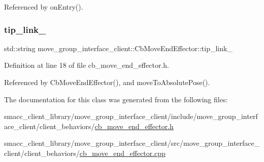 Referenced by on\+Entry().

\mbox{\label{classmove__group__interface__client_1_1CbMoveEndEffector_a26d35b0beeb0476a62a46b9b9d659251}} 
\subsubsection{\texorpdfstring{tip\+\_\+link\+\_\+}{tip\_link\_}}
{\footnotesize\ttfamily std\+::string move\+\_\+group\+\_\+interface\+\_\+client\+::\+Cb\+Move\+End\+Effector\+::tip\+\_\+link\+\_\+}



Definition at line 18 of file cb\+\_\+move\+\_\+end\+\_\+effector.\+h.



Referenced by Cb\+Move\+End\+Effector(), and move\+To\+Absolute\+Pose().



The documentation for this class was generated from the following files\+:\begin{DoxyCompactItemize}
\item 
smacc\+\_\+client\+\_\+library/move\+\_\+group\+\_\+interface\+\_\+client/include/move\+\_\+group\+\_\+interface\+\_\+client/client\+\_\+behaviors/\hyperlink{cb__move__end__effector_8h}{cb\+\_\+move\+\_\+end\+\_\+effector.\+h}\item 
smacc\+\_\+client\+\_\+library/move\+\_\+group\+\_\+interface\+\_\+client/src/move\+\_\+group\+\_\+interface\+\_\+client/client\+\_\+behaviors/\hyperlink{cb__move__end__effector_8cpp}{cb\+\_\+move\+\_\+end\+\_\+effector.\+cpp}\end{DoxyCompactItemize}
